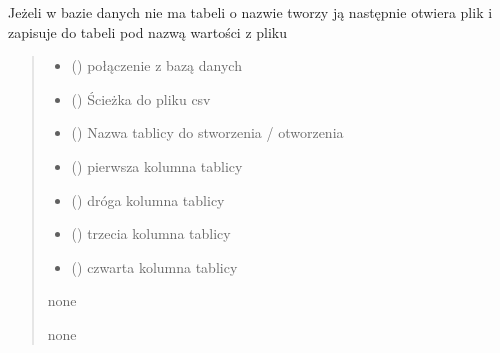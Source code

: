 \documentclass[letterpaper,10pt,polish]{sphinxmanual}
\begin{document}
\begin{fulllineitems}

\pysigstartsignatures
{}
\pysigstopsignatures
\sphinxAtStartPar
Jeżeli w bazie danych nie ma tabeli o nazwie  tworzy ją następnie otwiera plik  i zapisuje do tabeli pod nazwą  wartości z pliku
\begin{quote}\begin{description}
\begin{itemize}
\item {} 
\sphinxAtStartPar
{} () \textendash{} połączenie z bazą danych

\item {} 
\sphinxAtStartPar
{} () \textendash{} Ścieżka do pliku csv

\item {} 
\sphinxAtStartPar
{} () \textendash{} Nazwa tablicy do stworzenia / otworzenia

\item {} 
\sphinxAtStartPar
{} () \textendash{} pierwsza kolumna tablicy

\item {} 
\sphinxAtStartPar
{} () \textendash{} dróga kolumna tablicy

\item {} 
\sphinxAtStartPar
{} () \textendash{} trzecia kolumna tablicy

\item {} 
\sphinxAtStartPar
{} () \textendash{} czwarta kolumna tablicy

\end{itemize}

\sphinxAtStartPar
none

\sphinxAtStartPar
none

\end{description}\end{quote}

\end{fulllineitems}
\end{document}
